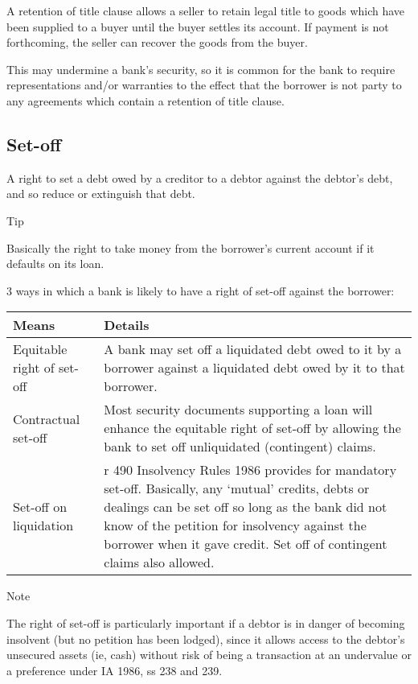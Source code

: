 \documentclass[
]{article}
\newenvironment{env-486fc4cd-eb32-4215-aaa2-fc77a67eebc5}
{
    \savenotes\tcolorbox[blanker,breakable,left=5pt,borderline west={2pt}{-4pt}{blue}]
}
{
    \endtcolorbox\spewnotes
}
\newenvironment{env-0c49cb39-e036-4df4-8974-f6a48144dfd4}
{
    \savenotes\tcolorbox[blanker,breakable,left=5pt,borderline west={2pt}{-4pt}{cyan}]
}
{
    \endtcolorbox\spewnotes
}
\begin{document}
A retention of title clause allows a seller to retain legal title to
goods which have been supplied to a buyer until the buyer settles its
account. If payment is not forthcoming, the seller can recover the goods
from the buyer.

This may undermine a bank's security, so it is common for the bank to
require representations and/or warranties to the effect that the
borrower is not party to any agreements which contain a retention of
title clause.

\hypertarget{set-off}{%
\subsection{Set-off}\label{set-off}}

A right to set a debt owed by a creditor to a debtor against the
debtor's debt, and so reduce or extinguish that debt.

\begin{env-0c49cb39-e036-4df4-8974-f6a48144dfd4}

Tip

Basically the right to take money from the borrower's current account if
it defaults on its loan.

\end{env-0c49cb39-e036-4df4-8974-f6a48144dfd4}

3 ways in which a bank is likely to have a right of set-off against the
borrower:

\begin{longtable}[]{@{}ll@{}}
\toprule()
Means & Details \\
\midrule()
\endhead
Equitable right of set-off & A bank may set off a liquidated debt owed
to it by a borrower against a liquidated debt owed by it to that
borrower. \\
Contractual set-off & Most security documents supporting a loan will
enhance the equitable right of set-off by allowing the bank to set off
unliquidated (contingent) claims. \\
Set-off on liquidation & r 490 Insolvency Rules 1986 provides for
mandatory set-off. Basically, any `mutual' credits, debts or dealings
can be set off so long as the bank did not know of the petition for
insolvency against the borrower when it gave credit. Set off of
contingent claims also allowed. \\
\bottomrule()
\end{longtable}

\begin{env-486fc4cd-eb32-4215-aaa2-fc77a67eebc5}

Note

The right of set-off is particularly important if a debtor is in danger
of becoming insolvent (but no petition has been lodged), since it allows
access to the debtor's unsecured assets (ie, cash) without risk of being
a transaction at an undervalue or a preference under IA 1986, ss 238 and
239.

\end{env-486fc4cd-eb32-4215-aaa2-fc77a67eebc5}
\end{document}
